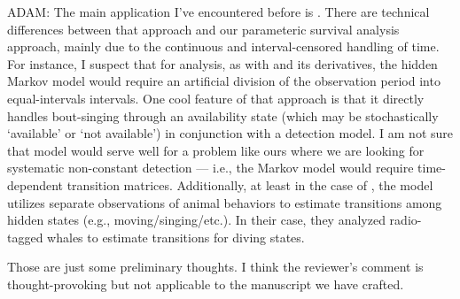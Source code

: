 \documentclass[12pt]{article}
\renewenvironment{quote}  %
              {\list{}{\rightmargin\leftmargin}\normalfont%
               \item\relax}
              {\endlist}
\newcommand{\adam}[1]{{\color{blue} ADAM: #1}}
\begin{document}
\begin{quote}
\adam{
The main application I've encountered before is \citet{Borchers2013}.
There are technical differences between that approach and our parameteric survival analysis approach, mainly due to the continuous and interval-censored handling of time.
For instance, I suspect that for analysis, as with \citet{Farnsworth2002} and its derivatives, the hidden Markov model would require an artificial division of the observation period into equal-intervals intervals.
One cool feature of that approach is that it directly handles bout-singing through an availability state (which may be stochastically `available' or `not available') in conjunction with a detection model.
I am not sure that model would serve well for a problem like ours where we are looking for systematic non-constant detection --- i.e., the Markov model would require time-dependent transition matrices.
Additionally, at least in the case of \citet{Borchers2013}, the model utilizes separate observations of animal behaviors to estimate transitions among hidden states (e.g., moving/singing/etc.).
In their case, they analyzed radio-tagged whales to estimate transitions for diving states.

Those are just some preliminary thoughts.
I think the reviewer's comment is thought-provoking but not applicable to the manuscript we have crafted.}
\end{quote}




\end{document}
